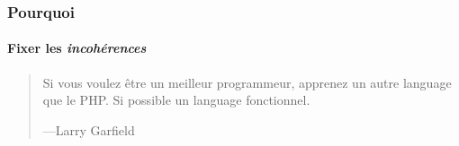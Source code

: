 \begin{frame}
	\frametitle{Pourquoi}
    \framesubtitle{Fixer les \textit{incohérences}}

    \begin{quote}
        Si vous voulez être un meilleur programmeur, apprenez un autre language que
        le PHP. Si possible un language fonctionnel.

        \begin{flushright}
            \tiny{---Larry Garfield}
        \end{flushright}
    \end{quote}
\end{frame}


